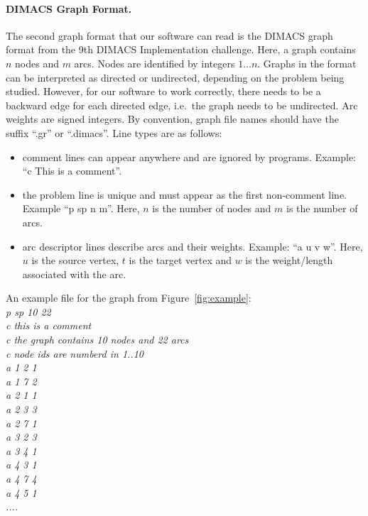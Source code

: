 \documentclass[11pt]{article}
\newcommand{\ie}{i.e.\ }
\begin{document}
\paragraph*{DIMACS Graph Format.}
The second graph format that our software can read is the DIMACS graph format from the 9th DIMACS Implementation challenge. 
Here, a graph contains $n$ nodes and $m$ arcs. Nodes are identified by integers $1\ldots n$. 
Graphs in the format can be interpreted as directed or undirected, depending on the problem being studied. However, for our software to work correctly, there needs to be a backward edge for each directed edge, \ie the graph needs to be undirected.
Arc weights are signed integers.
By convention, graph file names should have the suffix ``.gr'' or ``.dimacs''. 
Line types are as follows: 
\begin{itemize}
        \item comment lines can appear anywhere and are ignored by programs. Example: ``c This is a comment''.
        \item the problem line is unique and must appear as the first non-comment line. Example ``p sp n m''. Here, $n$ is the number of nodes and $m$ is the number of arcs.
        \item arc descriptor lines describe arcs and their weights. Example: ``a u v w''. Here, $u$ is the source vertex, $t$ is the target vertex and $w$ is the weight/length associated with the arc.
\end{itemize}
An example file for the graph from Figure~\ref{fig:example}: \\

\noindent
\textit{
        p sp 10 22 \\
        c this is a comment \\
        c the graph contains 10 nodes and 22 arcs \\
        c node ids are numberd in 1..10 \\
        a 1 2 1 \\
        a 1 7 2\\
        a 2 1 1\\
        a 2 3 3\\
        a 2 7 1\\
        a 3 2 3\\
        a 3 4 1\\
        a 4 3 1 \\
        a 4 7 4 \\
        a 4 5 1\\
        ....
}
\vfill
\pagebreak
\end{document}
